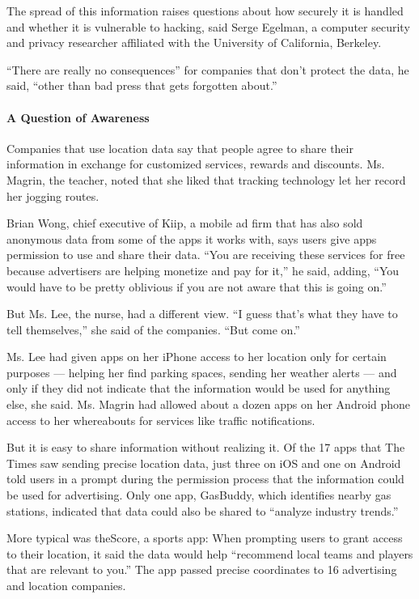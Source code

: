The spread of this information raises questions about how securely it is
handled and whether it is vulnerable to hacking, said Serge Egelman, a
computer security and privacy researcher affiliated with the University
of California, Berkeley.

``There are really no consequences'' for companies that don't protect
the data, he said, ``other than bad press that gets forgotten about.''

\hypertarget{a-question-of-awareness}{%
\paragraph{A Question of Awareness}\label{a-question-of-awareness}}

Companies that use location data say that people agree to share their
information in exchange for customized services, rewards and discounts.
Ms. Magrin, the teacher, noted that she liked that tracking technology
let her record her jogging routes.

Brian Wong, chief executive of Kiip, a mobile ad firm that has also sold
anonymous data from some of the apps it works with, says users give apps
permission to use and share their data. ``You are receiving these
services for free because advertisers are helping monetize and pay for
it,'' he said, adding, ``You would have to be pretty oblivious if you
are not aware that this is going on.''

But Ms. Lee, the nurse, had a different view. ``I guess that's what they
have to tell themselves,'' she said of the companies. ``But come on.''

Ms. Lee had given apps on her iPhone access to her location only for
certain purposes --- helping her find parking spaces, sending her
weather alerts --- and only if they did not indicate that the
information would be used for anything else, she said. Ms. Magrin had
allowed about a dozen apps on her Android phone access to her
whereabouts for services like traffic notifications.

But it is easy to share information without realizing it. Of the 17 apps
that The Times saw sending precise location data, just three on iOS and
one on Android told users in a prompt during the permission process that
the information could be used for advertising. Only one app, GasBuddy,
which identifies nearby gas stations, indicated that data could also be
shared to ``analyze industry trends.''

More typical was theScore, a sports app: When prompting users to grant
access to their location, it said the data would help ``recommend local
teams and players that are relevant to you.'' The app passed precise
coordinates to 16 advertising and location companies.

